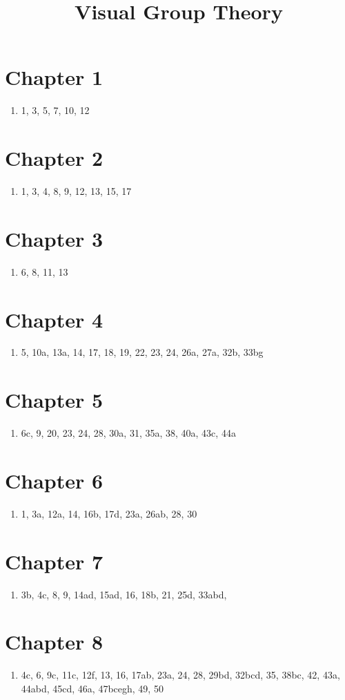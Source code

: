\documentclass[12pt]{article}
\begin{document}
\title{Visual Group Theory}
\author{}
\date{}
\maketitle

\section{Chapter 1}
\begin{enumerate}
\item 1, 3, 5, 7, 10, 12
\end{enumerate}


\section{Chapter 2}
\begin{enumerate}
\item 1, 3, 4, 8, 9, 12, 13, 15, 17
\end{enumerate}


\section{Chapter 3}
\begin{enumerate}
\item 6, 8, 11, 13
\end{enumerate}

\section{Chapter 4}
\begin{enumerate}
\item 5, 10a, 13a, 14, 17, 18, 19, 22, 23, 24, 26a, 27a, 32b, 33bg
\end{enumerate}


\section{Chapter 5}
\begin{enumerate}
\item 6c, 9, 20, 23, 24, 28, 30a, 31, 35a, 38, 40a, 43c, 44a
\end{enumerate}


\section{Chapter 6}
\begin{enumerate}
\item 1, 3a, 12a, 14, 16b, 17d, 23a, 26ab, 28, 30
\end{enumerate}


\section{Chapter 7}
\begin{enumerate}
\item 3b, 4c, 8, 9, 14ad, 15ad, 16, 18b, 21, 25d, 33abd,
\end{enumerate}


\section{Chapter 8}
\begin{enumerate}
\item 4c, 6, 9c, 11c, 12f, 13, 16, 17ab, 23a, 24, 28, 29bd, 32bcd, 35, 38bc, 42, 43a, 44abd, 45cd, 46a, 47bcegh, 49, 50
\end{enumerate}
\end{document}
